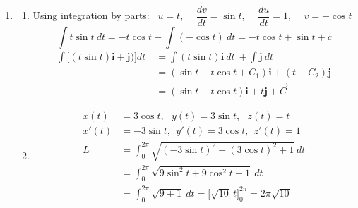 \documentclass[12pt]{amsart}
\begin{document}
\begin{enumerate}
	\item
		\begin{enumerate}
		
			\item Using integration by parts: \ $u=t$, \ \ $\dfrac{dv}{dt}=\sin t$, \ \ $\dfrac{du}{dt}=1$, \ \ 
			$v=-\cos t$ \\
			$$\int t\sin t \ dt = -t\cos t-\int(-\cos t) \ dt = -t\cos t+\sin t+c$$
				\begin{align*}
					\int\big[(t\sin t)\mathbf{i}+\mathbf{j})\big]dt\ &=\int (t\sin t)\mathbf{i} \ dt \ +\int\mathbf{j} \ 					dt\\
					&=(\sin t-t\cos t+C_1)\mathbf{i} + (t+C_2)\mathbf{j}\\
					&=(\sin t-t\cos t)\mathbf{i} + t\mathbf{j}+\vec{C}
				\end{align*}
									
			\item
				\begin{align*}
					x(t)&=3\cos t, \ \ \ y(t)=3\sin t, \ \ \ z(t)=t \\
					x'(t)&=-3\sin t, \ \ y'(t)=3\cos t, \ \ z'(t)=1 \\
					L&=\int^{2\pi}_0\sqrt{(-3\sin t)^2+(3\cos t)^2+1} \ dt \\
					&=\int^{2\pi}_0\sqrt{9\sin^2t+9\cos^2t+1} \ dt \\
					&=\int^{2\pi}_0\sqrt{9+1} \ dt = \big[\sqrt{10} \ t \big]^{2\pi}_0 = 2\pi\sqrt{10}
				\end{align*}
			
		\end{enumerate}
				
\end{enumerate}
\end{document}
